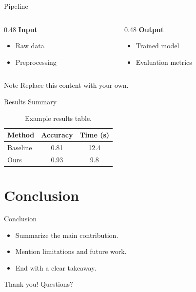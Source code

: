 \documentclass[aspectratio=169,11pt]{beamer}
\begin{document}
\begin{frame}{Pipeline}
  \begin{columns}[T]
    \begin{column}{0.48\textwidth}
      \textbf{Input}
      \begin{itemize}
        \item Raw data
        \item Preprocessing
      \end{itemize}
    \end{column}
    \begin{column}{0.48\textwidth}
      \textbf{Output}
      \begin{itemize}
        \item Trained model
        \item Evaluation metrics
      \end{itemize}
    \end{column}
  \end{columns}
  \vspace{1em}
  \begin{block}{Note}
    Replace this content with your own.
  \end{block}
\end{frame}

\begin{frame}{Results Summary}
  \begin{table}
    \centering
    \begin{tabular}{lcc}
      \hline
      Method & Accuracy & Time (s) \\
      \hline
      Baseline & 0.81 & 12.4 \\
      Ours     & 0.93 & 9.8  \\
      \hline
    \end{tabular}
    \caption{Example results table.}
  \end{table}
\end{frame}

\section{Conclusion}

\begin{frame}{Conclusion}
  \begin{itemize}
    \item Summarize the main contribution.
    \item Mention limitations and future work.
    \item End with a clear takeaway.
  \end{itemize}
  \vspace{1em}
  \centering
  \Large Thank you! Questions?
\end{frame}
\end{document}
